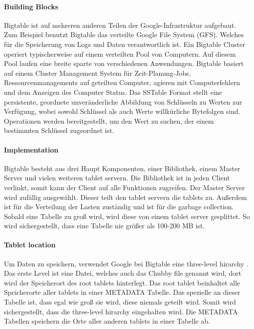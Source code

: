 \paragraph{Building Blocks}
Bigtable ist auf mehreren anderen Teilen der Google-Infrastruktur aufgebaut. Zum Beispiel benutzt Bigtable das verteilte Google File System (GFS). Welches für die Speicherung von Logs und Daten verantwortlich ist. Ein Bigtable Cluster operiert typischerweise auf einem verteilten Pool von Computern. Auf diesem Pool laufen eine breite sparte von verschiedenen Anwendungen. Bigtable basiert auf einem Cluster Management System für Zeit-Planung-Jobs, Ressourcenmanagements auf geteilten Computer, agieren mit Computerfehlern und dem Anzeigen des Computer Status. Das SSTable Format stellt eine persistente, geordnete unveränderliche Abbildung von Schlüsseln zu Werten zur Verfügung, wobei sowohl Schlüssel als auch Werte willkürliche Bytefolgen sind. Operationen werden bereitgestellt, um den Wert zu suchen, der einem bestimmten Schlüssel zugeordnet ist.

\paragraph{Implementation}
Bigtable besteht aus drei Haupt Komponenten, einer Bibliothek, einem Master Server und vielen weiteren tablet servern. Die Bibliothek ist in jeden Client verlinkt, somit kann der Client auf alle Funktionen zugreifen. Der Master Server wird zufällig ausgewählt. Dieser teilt den tablet servern die tablets zu. Außerdem ist für die Verteilung der Lasten zuständig und ist für die garbage collection. Sobald eine Tabelle zu groß wird, wird diese von einem tablet server gesplittet. So wird sichergestellt, dass eine Tabelle nie größer als 100-200 MB ist.

\paragraph{Tablet location}
Um Daten zu speichern, verwendet Google bei Bigtable eine \glqq three-level hirarchy \grqq. Das erste Level ist eine Datei, welches auch das Chubby file genannt wird, dort wird der Speicherort des root tablets hinterlegt. Das root tablet beinhaltet alle Speicherorte aller tablets in einer METADATA Tabelle. Das spezielle an dieser Tabelle ist, dass egal wie groß sie wird, diese niemals geteilt wird. Somit wird sichergestellt, dass die \glqq three-level hirarchy \grqq eingehalten wird. Die METADATA Tabellen speichern die Orte aller anderen tablets in einer Tabelle ab.

